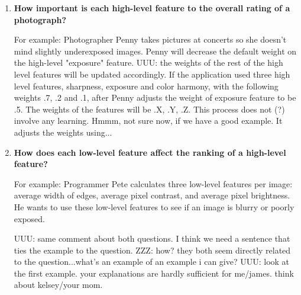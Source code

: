 \documentclass[11pt,letter]{article}
\begin{document}
\begin{enumerate}
\item \textbf{How important is each high-level feature to the overall rating of a photograph?}


For example: Photographer Penny takes pictures at concerts so she doesn't mind slightly underexposed images. Penny will decrease the default weight on the high-level "exposure" feature.
UUU: the weights of the rest of the high level features will be updated accordingly.
If the application used three high level features, sharpness, exposure and color harmony,
with the following weights .7, .2 and .1, after Penny adjusts the weight
of exposure feature to be .5. The weights of the features will be .X, .Y, .Z.
This process does not (?) involve any learning. Hmmm, not sure now, if we have
a good example. 
It adjusts the weights using...


\item \textbf{How does each low-level feature affect the ranking of a high-level feature?}


For example: Programmer Pete calculates three low-level features per image: average width of edges, average pixel contrast, and average pixel brightness. He wants to use these low-level features to see if an image is blurry or poorly exposed.

UUU: same comment about both questions. I think we need a sentence that ties the example to the question.
ZZZ: how? they both seem directly related to the question...what's an example of an example i can give? 
UUU: look at the first example. your explanations are hardly sufficient for me/james.
think about kelsey/your mom.

\end{enumerate}
\end{document}

